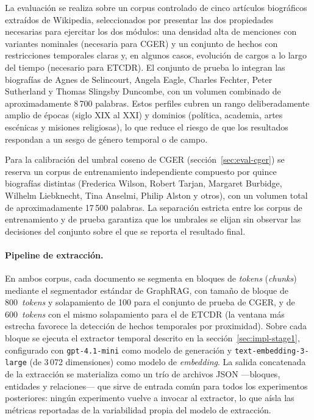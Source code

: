La evaluación se realiza sobre un corpus controlado de cinco artículos biográficos extraídos de Wikipedia\cite{TODO_wikipedia}, seleccionados por presentar las dos propiedades necesarias para ejercitar los dos módulos: una densidad alta de menciones con variantes nominales (necesaria para CGER) y un conjunto de hechos con restricciones temporales claras y, en algunos casos, evolución de cargos a lo largo del tiempo (necesario para ETCDR). El conjunto de prueba lo integran las biografías de Agnes de Selincourt, Angela Eagle, Charles Fechter, Peter Sutherland y Thomas Slingsby Duncombe, con un volumen combinado de aproximadamente 8\,700 palabras. Estos perfiles cubren un rango deliberadamente amplio de épocas (siglo XIX al XXI) y dominios (política, academia, artes escénicas y misiones religiosas), lo que reduce el riesgo de que los resultados respondan a un sesgo de género temporal o de campo.

Para la calibración del umbral coseno de CGER (sección~\ref{sec:eval-cger}) se reserva un corpus de entrenamiento independiente compuesto por quince biografías distintas (Frederica Wilson, Robert Tarjan, Margaret Burbidge, Wilhelm Liebknecht, Tina Anselmi, Philip Alston y otros), con un volumen total de aproximadamente 17\,500 palabras. La separación estricta entre los corpus de entrenamiento y de prueba garantiza que los umbrales se elijan sin observar las decisiones del conjunto sobre el que se reporta el resultado final.

\paragraph{Pipeline de extracción.} En ambos corpus, cada documento se segmenta en bloques de \emph{tokens} (\emph{chunks}) mediante el segmentador estándar de GraphRAG, con tamaño de bloque de 800~\emph{tokens} y solapamiento de 100 para el conjunto de prueba de CGER, y de 600~\emph{tokens} con el mismo solapamiento para el de ETCDR (la ventana más estrecha favorece la detección de hechos temporales por proximidad). Sobre cada bloque se ejecuta el extractor temporal descrito en la sección~\ref{sec:impl-stage1}, configurado con \texttt{gpt-4.1-mini}\cite{TODO_gpt41mini} como modelo de generación y \texttt{text-embedding-3-large}\cite{TODO_te3large} (de 3\,072 dimensiones) como modelo de \emph{embedding}. La salida concatenada de la extracción se materializa como un trío de archivos JSON ---bloques, entidades y relaciones--- que sirve de entrada común para todos los experimentos posteriores: ningún experimento vuelve a invocar al extractor, lo que aísla las métricas reportadas de la variabilidad propia del modelo de extracción.

